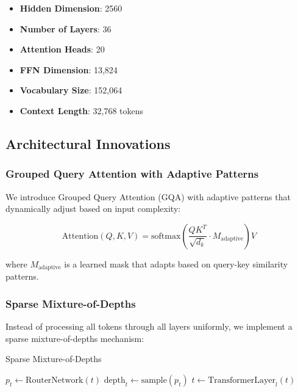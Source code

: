 \documentclass[11pt,a4paper]{article}
\begin{document}
\begin{itemize}
    \item \textbf{Hidden Dimension}: 2560
    \item \textbf{Number of Layers}: 36
    \item \textbf{Attention Heads}: 20
    \item \textbf{FFN Dimension}: 13,824
    \item \textbf{Vocabulary Size}: 152,064
    \item \textbf{Context Length}: 32,768 tokens
\end{itemize}

\subsection{Architectural Innovations}

\subsubsection{Grouped Query Attention with Adaptive Patterns}

We introduce Grouped Query Attention (GQA) with adaptive patterns that dynamically adjust based on input complexity:

\begin{equation}
\text{Attention}(Q, K, V) = \text{softmax}\left(\frac{QK^T}{\sqrt{d_k}} \cdot M_{\text{adaptive}}\right)V
\end{equation}

where $M_{\text{adaptive}}$ is a learned mask that adapts based on query-key similarity patterns.

\subsubsection{Sparse Mixture-of-Depths}

Instead of processing all tokens through all layers uniformly, we implement a sparse mixture-of-depths mechanism:

\begin{algorithm}
\caption{Sparse Mixture-of-Depths}
\begin{algorithmic}
    \STATE $p_t \leftarrow \text{RouterNetwork}(t)$
    \STATE $\text{depth}_t \leftarrow \text{sample}(p_t)$
        \STATE $t \leftarrow \text{TransformerLayer}_l(t)$
    \ENDFOR
\ENDFOR
\end{algorithmic}
\end{algorithm}
\end{document}
